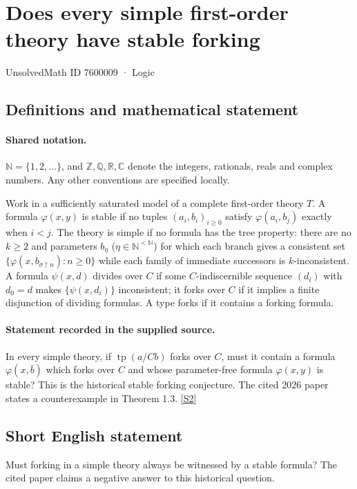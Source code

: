 \documentclass[11pt]{article}
\newcommand{\sref}[2]{\hyperlink{source:#1:#2}{[S#2]}}
\begin{document}
\setcounter{section}{7600008}
\section{Does every simple first-order theory have stable forking}\label{7600009}
{\small\sffamily UnsolvedMath ID 7600009 · Logic}
\subsection{Definitions and mathematical statement}

\paragraph{Shared notation.}$\mathbb N=\{1,2,\ldots\}$, and $\mathbb Z,\mathbb Q,\mathbb R,\mathbb C$ denote the integers, rationals, reals and complex numbers. Any other conventions are specified locally.


Work in a sufficiently saturated model of a complete first-order theory $T$. A formula $\varphi(x,y)$ is stable if no tuples $(a_i,b_i)_{i\ge0}$ satisfy $\varphi(a_i,b_j)$ exactly when $i<j$. The theory is simple if no formula has the tree property: there are no $k\ge2$ and parameters $b_\eta$ ($\eta\in\mathbb N^{<\mathbb N}$) for which each branch gives a consistent set $\{\varphi(x,b_{\sigma\upharpoonright n}):n\ge0\}$ while each family of immediate successors is $k$-inconsistent. A formula $\psi(x,d)$ divides over $C$ if some $C$-indiscernible sequence $(d_i)$ with $d_0=d$ makes $\{\psi(x,d_i)\}$ inconsistent; it forks over $C$ if it implies a finite disjunction of dividing formulas. A type forks if it contains a forking formula.
\paragraph{Statement recorded in the supplied source.}
In every simple theory, if $\operatorname{tp}(a/Cb)$ forks over $C$, must it contain a formula $\varphi(x,\bar b)$ which forks over $C$ and whose parameter-free formula $\varphi(x,y)$ is stable? This is the historical stable forking conjecture. The cited 2026 paper states a counterexample in Theorem 1.3. \sref{7600009}{2}
\subsection{Short English statement}
Must forking in a simple theory always be witnessed by a stable formula? The cited paper claims a negative answer to this historical question.
\end{document}
